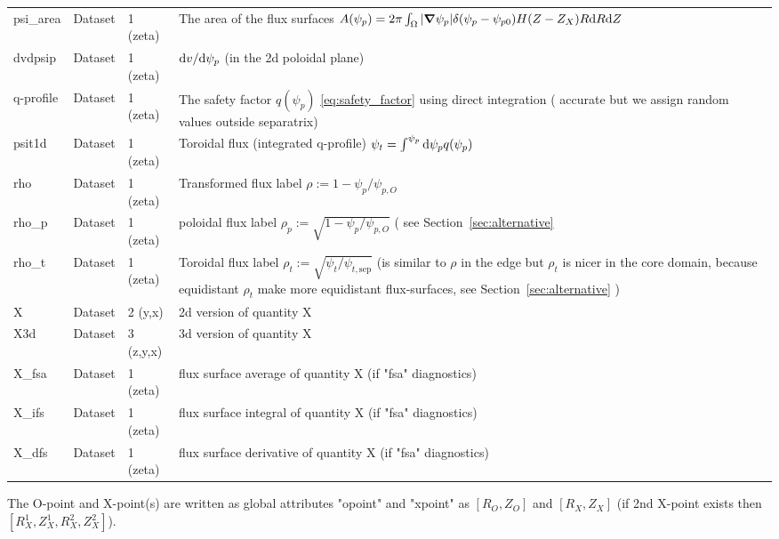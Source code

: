 \begin{longtable}{lll>{\RaggedRight}p{7cm}}
psi\_area        & Dataset & 1 (zeta) & The area of the flux surfaces $A(\psi_p) = 2\pi \int_\Omega |{\boldsymbol{\nabla}}\psi_p| \delta(\psi_p - \psi_{p0}) H(Z-Z_X) R\mathrm{d} R\mathrm{d} Z$ \\
dvdpsip          & Dataset & 1 (zeta) & $\mathrm{d} v/\mathrm{d}\psi_p$ (in the 2d poloidal plane) \\
q-profile        & Dataset & 1 (zeta) & The safety factor $q(\psi_p)$ \eqref{eq:safety_factor} using direct integration ( accurate but we assign random values outside separatrix) \\
psit1d           & Dataset & 1 (zeta) & Toroidal flux (integrated q-profile) $\psi_t = \int^{\psi_p} \mathrm{d}\psi_p q(\psi_p)$ \\
rho              & Dataset & 1 (zeta) & Transformed flux label $\rho:= 1 - \psi_p/\psi_{p,O}$ \\
rho\_p           & Dataset & 1 (zeta) & poloidal flux label $\rho_p:= \sqrt{1 - \psi_p/\psi_{p,O}}$  ( see Section~\ref{sec:alternative}\\
rho\_t           & Dataset & 1 (zeta) & Toroidal flux label $\rho_t :=
\sqrt{\psi_t/\psi_{t,\mathrm{sep}}}$ (is similar to $\rho$ in the edge but
$\rho_t$ is nicer in the core domain, because equidistant $\rho_t$ make
more equidistant flux-surfaces, see Section~\ref{sec:alternative} )\\
X      & Dataset & 2 (y,x) & 2d version of quantity X \\
X3d    & Dataset & 3 (z,y,x) & 3d version of quantity X \\
X\_fsa & Dataset & 1 (zeta) & flux surface average of quantity X (if "fsa" diagnostics)\\
X\_ifs & Dataset & 1 (zeta) & flux surface integral of quantity X (if "fsa" diagnostics)\\
X\_dfs & Dataset & 1 (zeta) & flux surface derivative of quantity X (if "fsa" diagnostics)\\
\bottomrule
\end{longtable}

The O-point and X-point(s) are written as global attributes "opoint" and "xpoint" as $[R_O,Z_O]$ and $[R_X,Z_X]$ (if 2nd X-point exists then $[R^1_X,Z^1_X,R^2_X,Z^2_X]$).

